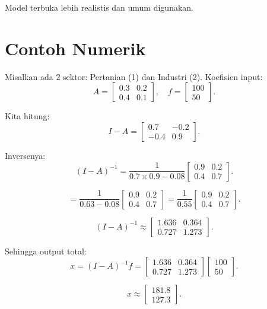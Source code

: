 \documentclass{bukumjh}
\begin{document}
Model terbuka lebih realistis dan umum digunakan.

\section{Contoh Numerik}
Misalkan ada 2 sektor: Pertanian (1) dan Industri (2). Koefisien input:
\[
A = \begin{bmatrix}
0.3 & 0.2 \\
0.4 & 0.1
\end{bmatrix}, \quad 
f = \begin{bmatrix}
100 \\ 50
\end{bmatrix}.
\]

Kita hitung:
\[
I-A = \begin{bmatrix}
0.7 & -0.2 \\
-0.4 & 0.9
\end{bmatrix}.
\]

Inversenya:
\[
(I-A)^{-1} = \frac{1}{0.7 \times 0.9 - 0.08} 
\begin{bmatrix}
0.9 & 0.2 \\
0.4 & 0.7
\end{bmatrix}.
\]

\[
= \frac{1}{0.63 - 0.08} 
\begin{bmatrix}
0.9 & 0.2 \\
0.4 & 0.7
\end{bmatrix}
= \frac{1}{0.55} 
\begin{bmatrix}
0.9 & 0.2 \\
0.4 & 0.7
\end{bmatrix}.
\]

\[
(I-A)^{-1} \approx 
\begin{bmatrix}
1.636 & 0.364 \\
0.727 & 1.273
\end{bmatrix}.
\]

Sehingga output total:
\[
x = (I-A)^{-1} f 
= \begin{bmatrix}
1.636 & 0.364 \\
0.727 & 1.273
\end{bmatrix}
\begin{bmatrix}
100 \\ 50
\end{bmatrix}.
\]

\[
x \approx 
\begin{bmatrix}
181.8 \\
127.3
\end{bmatrix}.
\]
\end{document}
